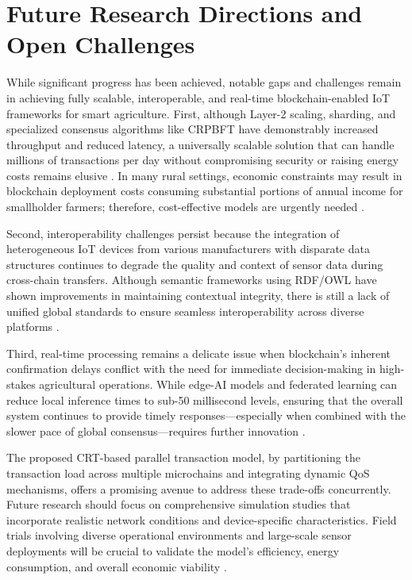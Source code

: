 \documentclass[12pt,onecolumn]{IEEEtran} %
\begin{document}
\section{Future Research Directions and Open Challenges}
While significant progress has been achieved, notable gaps and challenges remain in achieving fully scalable, interoperable, and real-time blockchain-enabled IoT frameworks for smart agriculture. First, although Layer-2 scaling, sharding, and specialized consensus algorithms like CRPBFT have demonstrably increased throughput and reduced latency, a universally scalable solution that can handle millions of transactions per day without compromising security or raising energy costs remains elusive \cite{huang2025digitaltraceabilityin, irfan2025aniotdrivensmart}. In many rural settings, economic constraints may result in blockchain deployment costs consuming substantial portions of annual income for smallholder farmers; therefore, cost-effective models are urgently needed \cite{irfan2025aniotdrivensmart, irfan2025aniotdrivensmart}.

Second, interoperability challenges persist because the integration of heterogeneous IoT devices from various manufacturers with disparate data structures continues to degrade the quality and context of sensor data during cross-chain transfers. Although semantic frameworks using RDF/OWL have shown improvements in maintaining contextual integrity, there is still a lack of unified global standards to ensure seamless interoperability across diverse platforms \cite{irfan2025aniotdrivensmart, huang2025digitaltraceabilityin}.

Third, real-time processing remains a delicate issue when blockchain's inherent confirmation delays conflict with the need for immediate decision-making in high-stakes agricultural operations. While edge-AI models and federated learning can reduce local inference times to sub-50 millisecond levels, ensuring that the overall system continues to provide timely responses---especially when combined with the slower pace of global consensus---requires further innovation \cite{huang2025digitaltraceabilityin, huang2025digitaltraceabilityin}.

The proposed CRT-based parallel transaction model, by partitioning the transaction load across multiple microchains and integrating dynamic QoS mechanisms, offers a promising avenue to address these trade-offs concurrently. Future research should focus on comprehensive simulation studies that incorporate realistic network conditions and device-specific characteristics. Field trials involving diverse operational environments and large-scale sensor deployments will be crucial to validate the model's efficiency, energy consumption, and overall economic viability \cite{thiruvenkatasamy2025anonlinetool, thiruvenkatasamy2025anonlinetool}.
\end{document}
